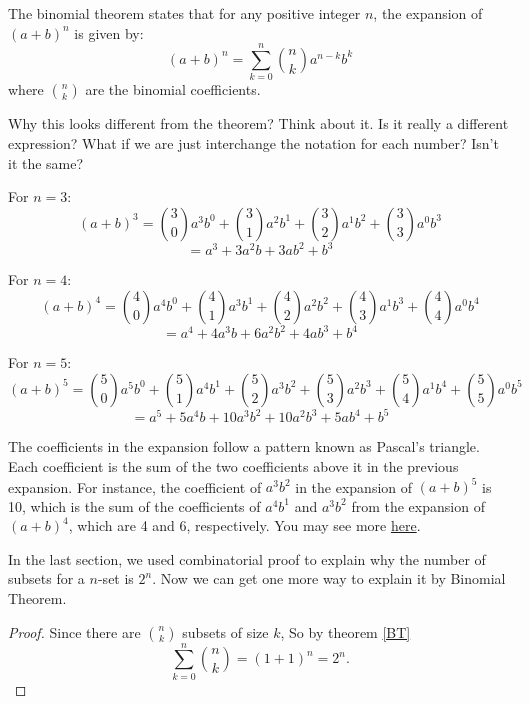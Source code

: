         \begin{example}
            The binomial theorem states that for any positive integer $n$, the expansion of $(a+b)^n$ is given by:
            \[
            (a + b)^n = \sum_{k=0}^{n} \binom{n}{k} a^{n-k} b^k
            \]
            where $\binom{n}{k}$ are the binomial coefficients.
            \begin{remark}
                Why this looks different from the theorem? Think about it. Is it really a different expression?
                What if we are just interchange the notation for each number? Isn't it the same?
            \end{remark}
            For $n=3$:
            \[
            (a + b)^3 = \binom{3}{0}a^{3}b^{0} + \binom{3}{1}a^{2}b^{1} + \binom{3}{2}a^{1}b^{2} + \binom{3}{3}a^{0}b^{3}
            \]
            \[
            = a^{3} + 3a^{2}b + 3ab^{2} + b^{3}
            \]
            
            For $n=4$:
            \[
            (a + b)^4 = \binom{4}{0}a^{4}b^{0} + \binom{4}{1}a^{3}b^{1} + \binom{4}{2}a^{2}b^{2} + \binom{4}{3}a^{1}b^{3} + \binom{4}{4}a^{0}b^{4}
            \]
            \[
            = a^{4} + 4a^{3}b + 6a^{2}b^{2} + 4ab^{3} + b^{4}
            \]
            
            For $n=5$:
            \[
            (a + b)^5 = \binom{5}{0}a^{5}b^{0} + \binom{5}{1}a^{4}b^{1} + \binom{5}{2}a^{3}b^{2} + \binom{5}{3}a^{2}b^{3} + \binom{5}{4}a^{1}b^{4} + \binom{5}{5}a^{0}b^{5}
            \]
            \[
            = a^{5} + 5a^{4}b + 10a^{3}b^{2} + 10a^{2}b^{3} + 5ab^{4} + b^{5}
            \]
            
            The coefficients in the expansion follow a pattern known as Pascal's triangle. Each coefficient is the sum of the two coefficients above it in the previous expansion. For instance, the coefficient of $a^{3}b^{2}$ in the expansion of $(a+b)^5$ is 10, which is the sum of the coefficients of $a^{4}b^{1}$ and $a^{3}b^{2}$ from the expansion of $(a+b)^4$, which are 4 and 6, respectively.
            You may see more \href{https://brilliant.org/wiki/pascals-triangle/}{here}.
            \end{example}
        
        In the last section, we used combinatorial proof to explain why the number of subsets for a $n$-set
        is $2^n$. Now we can get one more way to explain it by Binomial Theorem.
        \begin{proof}
            Since there are \(\binom{n}{k}\) subsets of size $k$, So by theorem \ref{BT}
            $$\sum_{k=0}^{n}\binom{n}{k}=(1+1)^n = 2^n.$$
        \end{proof}


